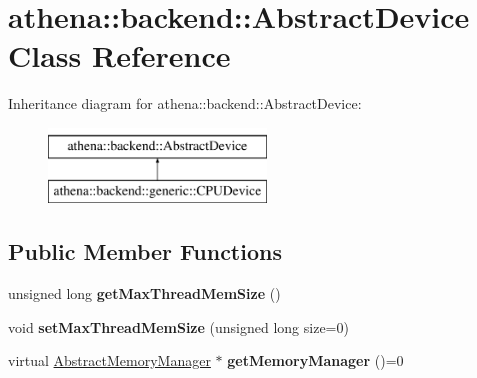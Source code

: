 \hypertarget{classathena_1_1backend_1_1_abstract_device}{}\section{athena\+:\+:backend\+:\+:Abstract\+Device Class Reference}
\label{classathena_1_1backend_1_1_abstract_device}
Inheritance diagram for athena\+:\+:backend\+:\+:Abstract\+Device\+:\begin{figure}[H]
\begin{center}
\leavevmode
\includegraphics[height=2.000000cm]{classathena_1_1backend_1_1_abstract_device}
\end{center}
\end{figure}
\subsection*{Public Member Functions}
\begin{DoxyCompactItemize}
\item 
\mbox{\label{classathena_1_1backend_1_1_abstract_device_a636bacaa5fc15731e3d5450c2fa56524}} 
unsigned long {\bfseries get\+Max\+Thread\+Mem\+Size} ()
\item 
\mbox{\label{classathena_1_1backend_1_1_abstract_device_a890a1711ae7203de704a2b223adddccc}} 
void {\bfseries set\+Max\+Thread\+Mem\+Size} (unsigned long size=0)
\item 
\mbox{\label{classathena_1_1backend_1_1_abstract_device_aa3c928fe7cfa24e484131dcfffd3c106}} 
virtual \mbox{\hyperlink{classathena_1_1backend_1_1_abstract_memory_manager}{Abstract\+Memory\+Manager}} $\ast$ {\bfseries get\+Memory\+Manager} ()=0
\end{DoxyCompactItemize}
